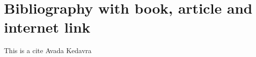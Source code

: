 \section{ Bibliography with book, article and internet link}
This is a cite \cite{harry} Avada Kedavra
\printbibliography